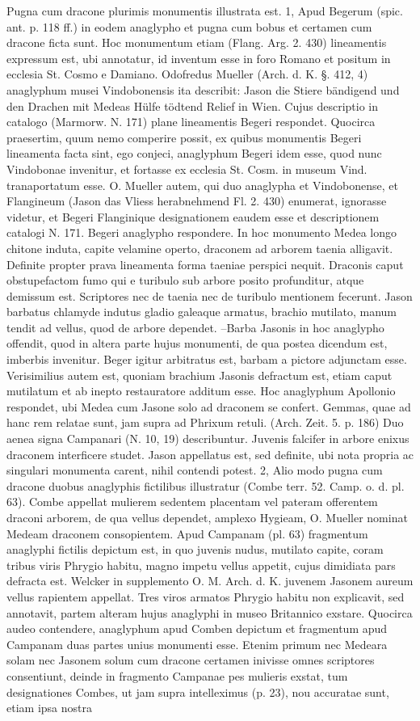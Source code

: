 \documentclass[landscape, a4paper, 11pt, oneside, polutonikogreek, german]{article}
\begin{document}
Pugna cum dracone plurimis monumentis illustrata est. 1, Apud Begerum (spic. ant. p. 118 ff.) in eodem anaglypho et pugna cum bobus et certamen cum dracone ficta sunt. Hoc monumentum etiam (Flang. Arg. 2. 430) lineamentis expressum est, ubi annotatur, id inventum esse in foro Romano et positum in ecclesia St. Cosmo e Damiano. Odofredus Mueller (Arch. d. K. §. 412, 4) anaglyphum musei Vindobonensis ita describit: Jason die Stiere bändigend und den Drachen mit Medeas Hülfe tödtend Relief in Wien. Cujus descriptio in catalogo (Marmorw. N. 171) plane lineamentis Begeri respondet. Quocirca praesertim, quum nemo comperire possit, ex quibus monumentis Begeri lineamenta facta sint, ego conjeci, anaglyphum Begeri idem esse, quod nunc Vindobonae invenitur, et fortasse ex ecclesia St. Cosm. in museum Vind. tranaportatum esse. O. Mueller autem, qui duo anaglypha et Vindobonense, et Flangineum (Jason das Vliess herabnehmend Fl. 2. 430) enumerat, ignorasse videtur, et Begeri Flanginique designationem eaudem esse et descriptionem catalogi N. 171. Begeri anaglypho respondere. In hoc monumento Medea longo chitone induta, capite velamine operto, draconem ad arborem taenia alligavit. Definite propter prava lineamenta forma taeniae perspici nequit. Draconis caput obstupefactom fumo qui e turibulo sub arbore posito profunditur, atque demissum est. Scriptores nec de taenia nec de turibulo mentionem fecerunt. Jason barbatus chlamyde indutus gladio galeaque armatus, brachio mutilato, manum tendit ad vellus, quod de arbore dependet. --Barba Jasonis in hoc anaglypho offendit, quod in altera parte hujus monumenti, de qua postea dicendum est, imberbis invenitur. Beger igitur arbitratus est, barbam a pictore adjunctam esse. Verisimilius autem est, quoniam brachium Jasonis defractum est, etiam caput mutilatum et ab inepto restauratore additum esse. Hoc anaglyphum Apollonio respondet, ubi Medea cum Jasone solo ad draconem se confert. Gemmas, quae ad hanc rem relatae sunt, jam supra ad Phrixum retuli. (Arch. Zeit. 5. p. 186) Duo aenea signa Campanari (N. 10, 19) describuntur. Juvenis falcifer in arbore enixus draconem interficere studet. Jason appellatus est, sed definite, ubi nota propria ac singulari monumenta carent, nihil contendi potest. 2, Alio modo pugna cum dracone duobus anaglyphis fictilibus illustratur (Combe terr. 52. Camp. o. d. pl. 63). Combe appellat mulierem sedentem placentam vel pateram offerentem draconi arborem, de qua vellus dependet, amplexo Hygieam, O. Mueller nominat Medeam draconem consopientem. Apud Campanam (pl. 63) fragmentum anaglyphi fictilis depictum est, in quo juvenis nudus, mutilato capite, coram tribus viris Phrygio habitu, magno impetu vellus appetit, cujus dimidiata pars defracta est. Welcker in supplemento O. M. Arch. d. K. juvenem Jasonem aureum vellus rapientem appellat. Tres viros armatos Phrygio habitu non explicavit, sed annotavit, partem alteram hujus anaglyphi in museo Britannico exstare. Quocirca audeo contendere, anaglyphum apud Comben depictum et fragmentum apud Campanam duas partes unius monumenti esse. Etenim primum nec Medeara solam nec Jasonem solum cum dracone certamen inivisse omnes scriptores consentiunt, deinde in fragmento Campanae pes mulieris exstat, tum designationes Combes, ut jam supra intelleximus (p. 23), nou accuratae sunt, etiam ipsa nostra 
\end{document}
